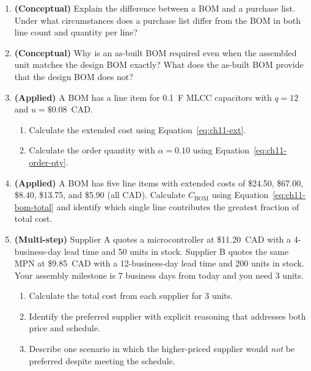 \begin{enumerate}
  \item \textbf{(Conceptual)} Explain the difference between a BOM and a
        purchase list.
        Under what circumstances does a purchase list differ from the BOM in
        both line count and quantity per line?

  \item \textbf{(Conceptual)} Why is an as-built BOM required even when the
        assembled unit matches the design BOM exactly?
        What does the as-built BOM provide that the design BOM does not?

  \item \textbf{(Applied)} A BOM has a line item for 0.1~\textmu F MLCC
        capacitors with $q = 12$ and $u = \$0.08$~CAD.
        \begin{enumerate}
          \item[(a)] Calculate the extended cost using
                Equation~\ref{eq:ch11-ext}.
          \item[(b)] Calculate the order quantity with $\alpha = 0.10$ using
                Equation~\ref{eq:ch11-order-qty}.
        \end{enumerate}

  \item \textbf{(Applied)} A BOM has five line items with extended costs of
        \$24.50, \$67.00, \$8.40, \$13.75, and \$5.90 (all CAD).
        Calculate $C_{\text{BOM}}$ using Equation~\ref{eq:ch11-bom-total} and
        identify which single line contributes the greatest fraction of total
        cost.

  \item \textbf{(Multi-step)} Supplier A quotes a microcontroller at
        \$11.20~CAD with a 4-business-day lead time and 50 units in stock.
        Supplier B quotes the same MPN at \$9.85~CAD with a 12-business-day
        lead time and 200 units in stock.
        Your assembly milestone is 7 business days from today and you need
        3 units.
        \begin{enumerate}
          \item[(a)] Calculate the total cost from each supplier for 3 units.
          \item[(b)] Identify the preferred supplier with explicit reasoning
                that addresses both price and schedule.
          \item[(c)] Describe one scenario in which the higher-priced supplier
                would \emph{not} be preferred despite meeting the schedule.
        \end{enumerate}
\end{enumerate}

